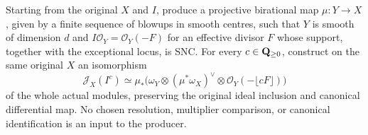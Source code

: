 \begin{lemma}
\label{lem:kn-nadel-original-resolution}
\notready
Starting from the original $X$ and $I$, produce a projective birational
map $\mu:Y\to X$, given by a finite sequence of blowups in smooth
centres, such that $Y$ is smooth of dimension $d$ and
$I\mathcal O_Y=\mathcal O_Y(-F)$ for an effective divisor $F$ whose
support, together with the exceptional locus, is SNC.  For every
$c\in\mathbf{Q}_{\geq0}$, construct on the same original $X$ an isomorphism
\[
 \mathcal J_X(I^c)\simeq
 \mu_*\bigl(\omega_Y\otimes(\mu^*\omega_X)^\vee
                         \otimes\mathcal O_Y(-\lfloor cF\rfloor)\bigr)
 \tag{N1}
\]
of the whole actual modules, preserving the original ideal inclusion
and canonical differential map.  No chosen resolution, multiplier
comparison, or canonical identification is an input to the producer.
\end{lemma}
